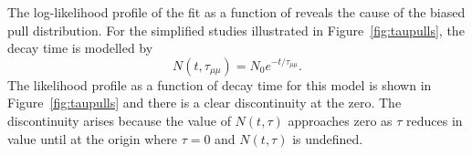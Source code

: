 
The log-likelihood profile of the  fit as a function of \tmumu reveals the cause of the biased pull distribution. For the simplified studies illustrated in Figure~\ref{fig:taupulls}, the decay time is modelled by
\begin{equation}
N(t, \tau_{\mu \mu}) = N_{0}e^{-t/\tau_{\mu\mu}}.
\end{equation}
The likelihood profile as a function of decay time for this model is shown in Figure~\ref{fig:taupulls} and there is a clear discontinuity at the zero. The discontinuity arises because the value of $N(t, \tau)$ approaches zero as $\tau$ reduces in value until at the origin where $\tau = 0$ and $N(t, \tau)$ is undefined. %


